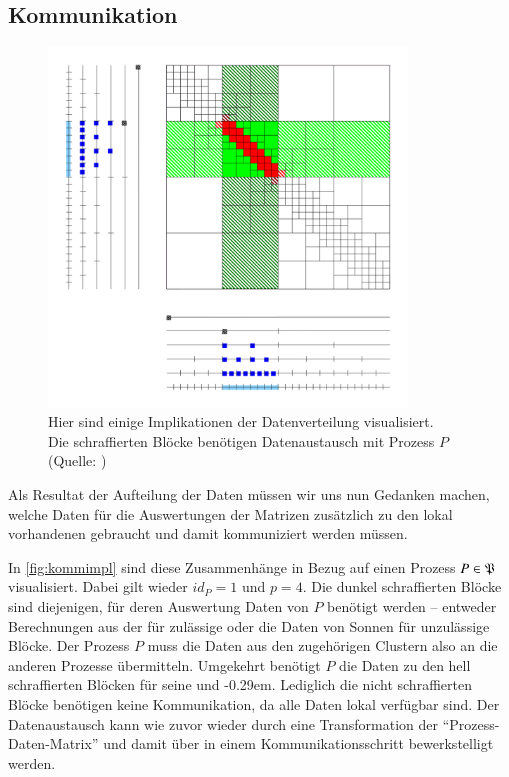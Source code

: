   \subsection{Kommunikation}
  \label{sec:komm}
    \begin{figure}[t]
      \includegraphics[width=0.85\textwidth]{img/kommimpl.png}
      \caption{Hier sind einige Implikationen der Datenverteilung visualisiert.\\
	       Die schraffierten Blöcke benötigen Datenaustausch mit Prozess $P$\\
	       (Quelle: \citet{h2slides})}
      \label{fig:kommimpl}
    \end{figure}

    Als Resultat der Aufteilung der Daten müssen wir uns nun Gedanken machen, welche Daten für die Auswertungen der Matrizen zusätzlich zu den lokal vorhandenen gebraucht und damit kommuniziert werden 
    müssen.
    
    In \autoref{fig:kommimpl} sind diese Zusammenhänge in Bezug auf einen Prozess $P \in \mathfrak{P}$ visualisiert. Dabei gilt wieder $id_P=1$ und $p=4$. Die dunkel schraffierten Blöcke sind diejenigen, 
    für deren Auswertung Daten von $P$ benötigt werden --
    entweder Berechnungen aus der \vorw für zulässige oder die Daten von Sonnen für unzulässige Blöcke. Der Prozess $P$ muss die Daten aus den zugehörigen Clustern also an die anderen Prozesse 
    übermitteln. Umgekehrt benötigt $P$ die Daten zu den hell schraffierten Blöcken für seine \koppl und \ruckw \kern-0.29em. Lediglich die nicht schraffierten Blöcke benötigen keine Kommunikation, 
    da alle Daten lokal verfügbar sind. Der Datenaustausch kann wie zuvor wieder durch eine Transformation der ``Prozess-Daten-Matrix'' und damit über  in einem 
    Kommunikationsschritt bewerkstelligt werden. 
    
